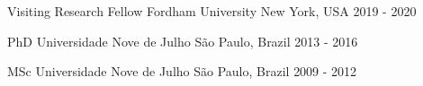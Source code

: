 

\begin{cventries}

  \cventry
    {Visiting Research Fellow} %
    {Fordham University} %
    {New York, USA} %
    {2019 - 2020} %
    {}

  \cventry
    {PhD} %
    {Universidade Nove de Julho} %
    {São Paulo, Brazil} %
    {2013 - 2016} %
    {}

  \cventry
    {MSc} %
    {Universidade Nove de Julho} %
    {São Paulo, Brazil} %
    {2009 - 2012} %
    {}

\end{cventries}
